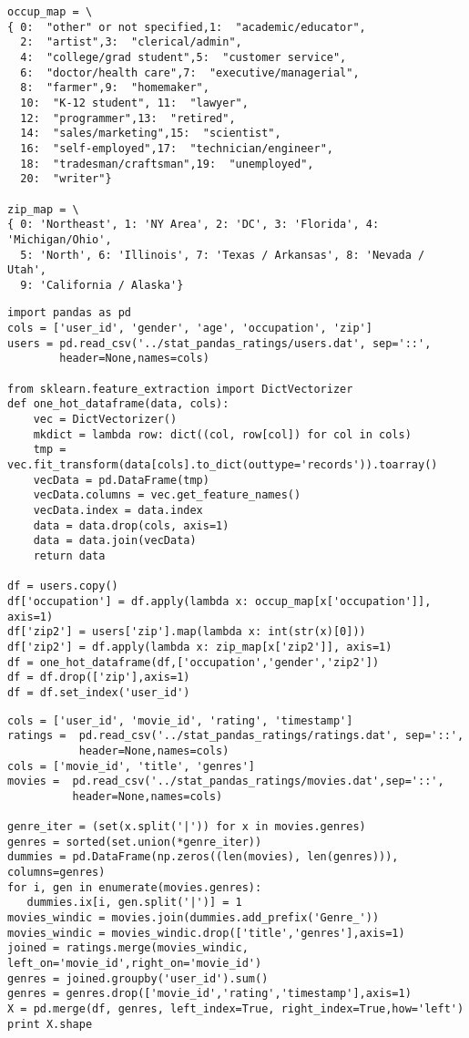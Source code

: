 \documentclass[12pt,fleqn]{article}\usepackage{../common}
\begin{document}
\begin{verbatim}
occup_map = \
{ 0:  "other" or not specified,1:  "academic/educator",
  2:  "artist",3:  "clerical/admin",
  4:  "college/grad student",5:  "customer service",
  6:  "doctor/health care",7:  "executive/managerial",
  8:  "farmer",9:  "homemaker",
  10:  "K-12 student", 11:  "lawyer",
  12:  "programmer",13:  "retired",
  14:  "sales/marketing",15:  "scientist",
  16:  "self-employed",17:  "technician/engineer",
  18:  "tradesman/craftsman",19:  "unemployed",
  20:  "writer"}

zip_map = \
{ 0: 'Northeast', 1: 'NY Area', 2: 'DC', 3: 'Florida', 4: 'Michigan/Ohio', 
  5: 'North', 6: 'Illinois', 7: 'Texas / Arkansas', 8: 'Nevada / Utah', 
  9: 'California / Alaska'}
\end{verbatim}


\begin{verbatim}
import pandas as pd
cols = ['user_id', 'gender', 'age', 'occupation', 'zip']
users = pd.read_csv('../stat_pandas_ratings/users.dat', sep='::', 
        header=None,names=cols)

from sklearn.feature_extraction import DictVectorizer
def one_hot_dataframe(data, cols):
    vec = DictVectorizer()
    mkdict = lambda row: dict((col, row[col]) for col in cols)
    tmp = vec.fit_transform(data[cols].to_dict(outtype='records')).toarray()
    vecData = pd.DataFrame(tmp)
    vecData.columns = vec.get_feature_names()
    vecData.index = data.index
    data = data.drop(cols, axis=1)
    data = data.join(vecData)
    return data

df = users.copy()
df['occupation'] = df.apply(lambda x: occup_map[x['occupation']], axis=1)
df['zip2'] = users['zip'].map(lambda x: int(str(x)[0]))
df['zip2'] = df.apply(lambda x: zip_map[x['zip2']], axis=1)
df = one_hot_dataframe(df,['occupation','gender','zip2'])
df = df.drop(['zip'],axis=1)
df = df.set_index('user_id')
\end{verbatim}

\begin{verbatim}
cols = ['user_id', 'movie_id', 'rating', 'timestamp']
ratings =  pd.read_csv('../stat_pandas_ratings/ratings.dat', sep='::',
           header=None,names=cols)
cols = ['movie_id', 'title', 'genres']
movies =  pd.read_csv('../stat_pandas_ratings/movies.dat',sep='::',
          header=None,names=cols)

genre_iter = (set(x.split('|')) for x in movies.genres)
genres = sorted(set.union(*genre_iter))
dummies = pd.DataFrame(np.zeros((len(movies), len(genres))), columns=genres)
for i, gen in enumerate(movies.genres):
   dummies.ix[i, gen.split('|')] = 1
movies_windic = movies.join(dummies.add_prefix('Genre_'))
movies_windic = movies_windic.drop(['title','genres'],axis=1)
joined = ratings.merge(movies_windic, left_on='movie_id',right_on='movie_id')
genres = joined.groupby('user_id').sum()
genres = genres.drop(['movie_id','rating','timestamp'],axis=1)
X = pd.merge(df, genres, left_index=True, right_index=True,how='left')
print X.shape
\end{verbatim}
\end{document}
